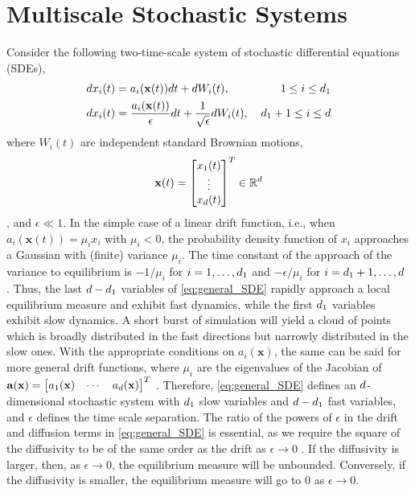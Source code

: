 \section{Multiscale Stochastic Systems} \label{subsec:multiscale_SDE}

Consider the following two-time-scale system of stochastic differential equations (SDEs),
\begin{equation} \label{eq:general_SDE}
\begin{aligned}
dx_i(t) &= a_i(\mathbf{x}(t)) dt + dW_i(t), & \: 1 \le i \le {d_1} \\
dx_i(t) &= \frac{a_i(\mathbf{x}(t))}{\epsilon} dt + \frac{1}{\sqrt{\epsilon}} dW_i(t) , & \: {d_1}+1 \le i \le d
\end{aligned}
\end{equation}
where $W_i(t)$ are independent standard Brownian motions, $$\mathbf{x}(t)  = \begin{bmatrix} x_1(t) \\ \vdots \\ x_d(t) \end{bmatrix}^T \in \mathbb{R}^d$$, and $\epsilon \ll 1$.
%
In the simple case of a linear drift function, i.e., when $a_i(\mathbf{x}(t)) = \mu _i x_i$ with $\mu_i < 0$, the probability density function of $x_i$ approaches a Gaussian with
(finite) variance $\mu_i$.
%
The time constant of the approach of the variance to equilibrium is $-1/\mu_i$ for $i=1,\ldots,{d_1}$ and $-\epsilon/\mu_i$ for $i={d_1}+1,\ldots,d$ \cite{lelievre2013optimal}.
%
Thus, the last $d-{d_1}$ variables of \eqref{eq:general_SDE} rapidly approach a local equilibrium measure and exhibit fast dynamics, while the first ${d_1}$ variables exhibit slow dynamics.
%
A short burst of simulation will yield a cloud of points which is broadly distributed in the fast directions but narrowly distributed in the slow ones.
%
With the appropriate conditions on $a_i(\mathbf{x})$, the same can be said for more general drift
functions, where $\mu_i$ are the eigenvalues of the Jacobian of $\mathbf{a}(\mathbf{x}) = \begin{bmatrix} a_1(\mathbf{x}) & \cdots & a_d(\mathbf{x}) \end{bmatrix}^T$ \cite{villani2009hypocoercivity}.
%
Therefore, \eqref{eq:general_SDE} defines an $d$-dimensional stochastic system with ${d_1}$ slow
variables and $d-{d_1}$ fast variables, and $\epsilon$ defines the time scale separation.
%
The ratio of the powers of $\epsilon$ in the drift and diffusion terms in \eqref{eq:general_SDE} is essential,
as we require the square of the diffusivity to be of the same order as the drift as $\epsilon \rightarrow 0$ \cite{berglund2003geometric}.
%
If the diffusivity is larger, then, as $\epsilon \rightarrow 0$, the equilibrium measure will be
unbounded.
%
Conversely, if the diffusivity is smaller, the equilibrium measure will go to $0$ as $\epsilon \rightarrow 0$.

